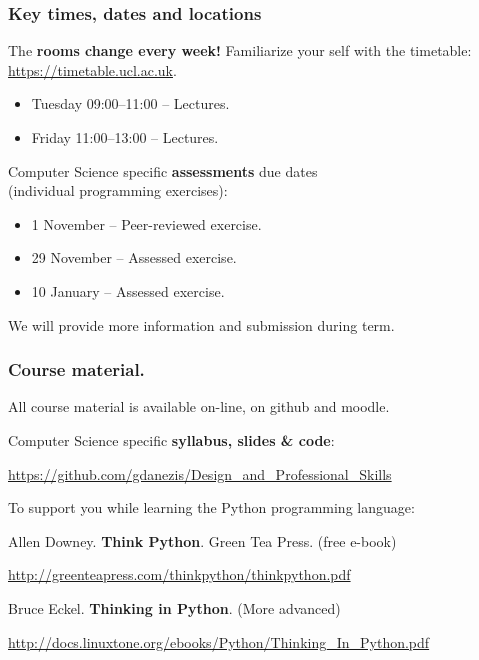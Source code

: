 \documentclass{beamer} %
\newcommand\emc[1]{\textcolor{brightblue}{\textbf{#1}}}
\begin{document}
\begin{frame}
\frametitle{Key times, dates and locations} 

The \emc{rooms change every week!}
Familiarize your self with the timetable: \url{https://timetable.ucl.ac.uk}.

\begin{itemize}
	\item Tuesday 09:00--11:00 -- Lectures.
	\item Friday 11:00--13:00 -- Lectures.
\end{itemize}

\vspace{3mm}
Computer Science specific \emc{assessments} due dates \\ (individual programming exercises):
\begin{itemize}
	\item 1 November -- Peer-reviewed exercise.
	\item 29 November -- Assessed exercise.
	\item 10 January -- Assessed exercise.
\end{itemize}
We will provide more information and submission during term.


\end{frame}

\begin{frame}
\frametitle{Course material.} 

All course material is available on-line, on github and moodle.

\vspace{7mm}
Computer Science specific \emc{syllabus, slides \& code}: 

\url{https://github.com/gdanezis/Design_and_Professional_Skills}

\vspace{7mm}
To support you while learning the Python programming language:

\vspace{2mm}
Allen Downey. \emc{Think Python}. Green Tea Press. (free e-book)

{\small \url{http://greenteapress.com/thinkpython/thinkpython.pdf} }

\vspace{2mm}
Bruce Eckel. \emc{Thinking in Python}. (More advanced)

{\small \url{http://docs.linuxtone.org/ebooks/Python/Thinking_In_Python.pdf} }


\end{frame}
\end{document}
